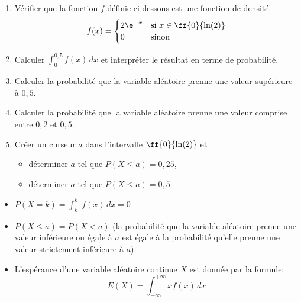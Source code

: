 \begin{exemple}{}
\begin{enumerate}
	\item Vérifier que la fonction $f$ définie ci-dessous est une fonction de densité.
	$$f(x) = \begin{cases}
2\e^{-x} & \text{si } x \in \ff{0}{\ln(2)}  \\
0 & \text{sinon}
\end{cases}$$
	\item Calculer $\displaystyle\int_{0}^{0,5} f(x) \, dx$ et interpréter le résultat en terme de probabilité.
	\item Calculer la probabilité que la variable aléatoire prenne une valeur supérieure à $0,5$.
	\item Calculer la probabilité que la variable aléatoire prenne une valeur comprise entre $0,2$ et $0,5$.
	\item Créer un curseur $a$ dans l'intervalle $\ff{0}{\ln(2)}$ et 
	\begin{itemize}
		\item déterminer $a$ tel que $P(X \leq a) = 0,25$,
		\item déterminer $a$ tel que $P(X \leq a) = 0,5$.
	\end{itemize}
\end{enumerate}
\end{exemple}

\begin{propriete}{}
\begin{itemize}
	\item $P(X=k)=\displaystyle\int_k^k\;f(x)\,dx=0$ 
	\item $P(X \leq a) = P(X < a)$ (la probabilité que la variable aléatoire prenne une valeur inférieure ou égale à $a$ est égale à la probabilité qu'elle prenne une valeur strictement inférieure à $a$)
	\item L'espérance d'une variable aléatoire continue $X$ est donnée par la formule: \[E(X) = \displaystyle\int_{-\infty}^{+\infty} x f(x) \, dx\]
\end{itemize}
\end{propriete}

